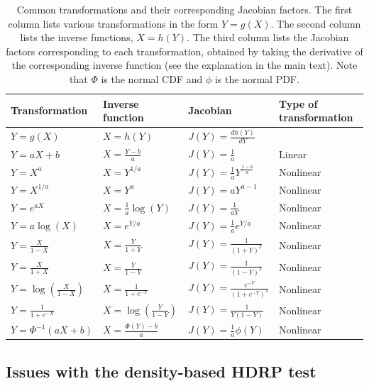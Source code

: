 \documentclass[man]{apa}
\newcommand{\hdr}{HDRP}
\begin{document}
\begin{table}[bth]
\centering 
\begin{tabular}{llll}
Transformation & Inverse function & Jacobian & Type of transformation  \\ 
\hline
$Y = g(X)$ & $X = h(Y)$ & $J(Y) =\frac{dh(Y)}{dY}$ &  \\
$Y=aX +b$  & $X= \frac{Y-b}{a}$ & $J(Y)=\frac{1}{a}$ & Linear \\
$Y= X^a$   & $X = Y^{1/a}$      & $J(Y)=\frac{1}{a} Y^{\frac{1-a}{a}}$ & Nonlinear \\
$Y= X^{1/a}$ & $X = Y^{a}$ & $J(Y)=a Y^{a-1}$ & Nonlinear \\
$Y = e^{aX}$ & $X = \frac{1}{a}\log(Y)$ & $J(Y)=\frac{1}{aY}$& Nonlinear \\
$Y = a\log(X)$  & $X = e^{Y/a}$ & $J(Y)=\frac{1}{a}e^{Y/a}$& Nonlinear \\
$Y = \frac{X}{1-X}$ & $X = \frac{Y}{1+Y}$  & $J(Y)=\frac{1}{(1+Y)^2}$ & Nonlinear\\
$Y = \frac{X}{1+X}$ & $X = \frac{Y}{1-Y}$ & $J(Y)=\frac{1}{(1-Y)^2}$& Nonlinear\\
$Y = \log\left(\frac{X}{1-X}\right)$ & $X = \frac{1}{1+e^{-Y}}$ & $J(Y)=\frac{e^{-Y}}{\left(1+e^{-Y}\right)^2}$& Nonlinear \\
$Y = \frac{1}{1+e^{-X}}$ & $X = \log\left(\frac{Y}{1-Y}\right)$ & $J(Y)=\frac{1}{Y(1-Y)}$& Nonlinear\\
$Y = \Phi^{-1}(aX+b)$ & $X = \frac{\Phi(Y)-b}{a}$  & $J(Y)=\frac{1}{a}\phi(Y)$& Nonlinear\\
\end{tabular}
\caption{Common transformations and their corresponding Jacobian factors. The first column lists various transformations in the form $Y=g(X)$. The second column lists the inverse functions, $X=h(Y)$. The third column lists the Jacobian factors corresponding to each transformation, obtained by taking the derivative of the corresponding inverse function (see the explanation in the main text). Note that $\Phi$ is the normal CDF and $\phi$ is the normal PDF.}
\label{tab:transformations}
\end{table}




 \subsection*{Issues with the density-based \hdr{} test}
\end{document}
